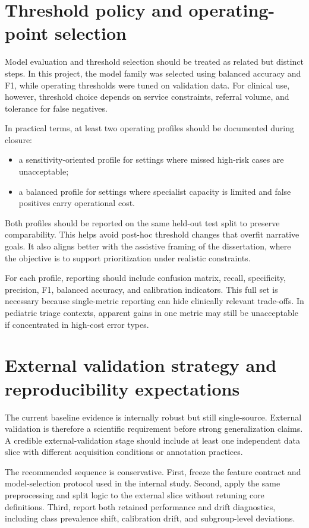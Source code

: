 \section{Threshold policy and operating-point selection}
Model evaluation and threshold selection should be treated as related but distinct steps. In this project, the model family was selected using balanced accuracy and F1, while operating thresholds were tuned on validation data. For clinical use, however, threshold choice depends on service constraints, referral volume, and tolerance for false negatives.

In practical terms, at least two operating profiles should be documented during closure:
\begin{itemize}[leftmargin=1.2cm]
    \item a sensitivity-oriented profile for settings where missed high-risk cases are unacceptable;
    \item a balanced profile for settings where specialist capacity is limited and false positives carry operational cost.
\end{itemize}

Both profiles should be reported on the same held-out test split to preserve comparability. This helps avoid post-hoc threshold changes that overfit narrative goals. It also aligns better with the assistive framing of the dissertation, where the objective is to support prioritization under realistic constraints.

For each profile, reporting should include confusion matrix, recall, specificity, precision, F1, balanced accuracy, and calibration indicators. This full set is necessary because single-metric reporting can hide clinically relevant trade-offs. In pediatric triage contexts, apparent gains in one metric may still be unacceptable if concentrated in high-cost error types.

\section{External validation strategy and reproducibility expectations}
The current baseline evidence is internally robust but still single-source. External validation is therefore a scientific requirement before strong generalization claims. A credible external-validation stage should include at least one independent data slice with different acquisition conditions or annotation practices.

The recommended sequence is conservative. First, freeze the feature contract and model-selection protocol used in the internal study. Second, apply the same preprocessing and split logic to the external slice without retuning core definitions. Third, report both retained performance and drift diagnostics, including class prevalence shift, calibration drift, and subgroup-level deviations.

